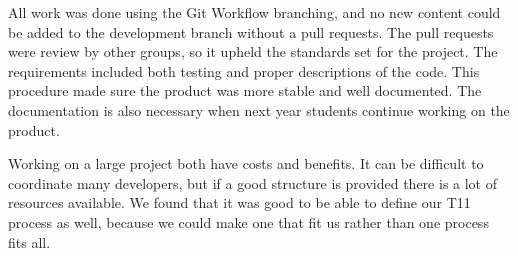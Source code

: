 All work was done using the Git Workflow branching, and no new content could be added to the development branch without a pull requests. The pull requests were review by other groups, so it upheld the standards set for the project. The requirements included both testing and proper descriptions of the code. This procedure made sure the product was more stable and well documented. The documentation is also necessary when next year students continue working on the product. 

Working on a large project both have costs and benefits. It can be difficult to coordinate many developers, but if a good structure is provided there is a lot of resources available. We found that it was good to be able to define our \gls{T11} process as well, because we could make one that fit us rather than one process fits all. 